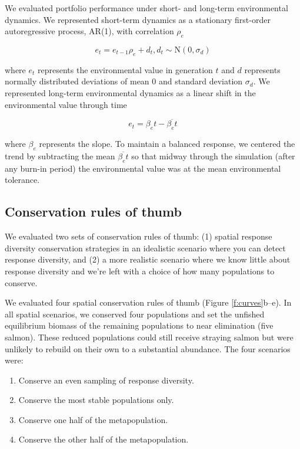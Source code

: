 We evaluated portfolio performance under short- and long-term environmental dynamics. We represented short-term dynamics as a stationary first-order autoregressive process, AR(1), with correlation $\rho_e$

\begin{equation}
  e_t = e_{t-1} \rho_e + d_t, d_t \sim \mathrm{N}(0, \sigma_d)
\end{equation}

\noindent where $e_t$ represents the environmental value in generation $t$ and $d$ represents normally distributed deviations of mean 0 and standard deviation $\sigma_d$. We represented long-term environmental dynamics as a linear shift in the environmental value through time

\begin{equation}
  e_t = \beta_e t - \overline{\beta_e t}
\end{equation}

\noindent where $\beta_e$ represents the slope. To maintain a balanced response, we centered the trend by subtracting the mean $\overline{\beta_e t}$ so that midway through the simulation (after any burn-in period) the environmental value was at the mean environmental tolerance.

\subsection{Conservation rules of thumb}

We evaluated two sets of conservation rules of thumb: (1) spatial response diversity conservation strategies in an idealistic scenario where you can detect response diversity, and (2) a more realistic scenario where we know little about response diversity and we're left with a choice of how many populations to conserve.

We evaluated four spatial conservation rules of thumb (Figure \ref{f:curves}b--e). In all spatial scenarios, we conserved four populations and set the unfished equilibrium biomass of the remaining populations to near elimination (five salmon). These reduced populations could still receive straying salmon but were unlikely to rebuild on their own to a substantial abundance. The four scenarios were:

\begin{enumerate}
\def\labelenumi{\arabic{enumi}.}
\itemsep1pt\parskip0pt
\item
  Conserve an even sampling of response diversity.
\item
  Conserve the most stable populations only.
\item
  Conserve one half of the metapopulation.
\item
  Conserve the other half of the metapopulation.
\end{enumerate}

